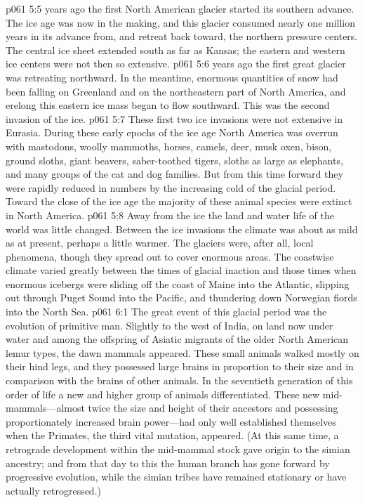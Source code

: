 \pc \vs p061 5:5  years ago the first North American glacier started its southern advance. The ice age was now in the making, and this glacier consumed nearly one million years in its advance from, and retreat back toward, the northern pressure centers. The central ice sheet extended south as far as Kansas; the eastern and western ice centers were not then so extensive.
\pc \vs p061 5:6  years ago the first great glacier was retreating northward. In the meantime, enormous quantities of snow had been falling on Greenland and on the northeastern part of North America, and erelong this eastern ice mass began to flow southward. This was the second invasion of the ice.
\vs p061 5:7 These first two ice invasions were not extensive in Eurasia. During these early epochs of the ice age North America was overrun with mastodons, woolly mammoths, horses, camels, deer, musk oxen, bison, ground sloths, giant beavers, saber\hyp{}toothed tigers, sloths as large as elephants, and many groups of the cat and dog families. But from this time forward they were rapidly reduced in numbers by the increasing cold of the glacial period. Toward the close of the ice age the majority of these animal species were extinct in North America.
\vs p061 5:8 Away from the ice the land and water life of the world was little changed. Between the ice invasions the climate was about as mild as at present, perhaps a little warmer. The glaciers were, after all, local phenomena, though they spread out to cover enormous areas. The coastwise climate varied greatly between the times of glacial inaction and those times when enormous icebergs were sliding off the coast of Maine into the Atlantic, slipping out through Puget Sound into the Pacific, and thundering down Norwegian fiords into the North Sea.
\vs p061 6:1 The great event of this glacial period was the evolution of primitive man. Slightly to the west of India, on land now under water and among the offspring of Asiatic migrants of the older North American lemur types, the dawn mammals  appeared. These small animals walked mostly on their hind legs, and they possessed large brains in proportion to their size and in comparison with the brains of other animals. In the seventieth generation of this order of life a new and higher group of animals  differentiated. These new mid\hyp{}mammals---almost twice the size and height of their ancestors and possessing proportionately increased brain power---had only well established themselves when the Primates, the third vital mutation,  appeared. (At this same time, a retrograde development within the mid\hyp{}mammal stock gave origin to the simian ancestry; and from that day to this the human branch has gone forward by progressive evolution, while the simian tribes have remained stationary or have actually retrogressed.)\plusone
